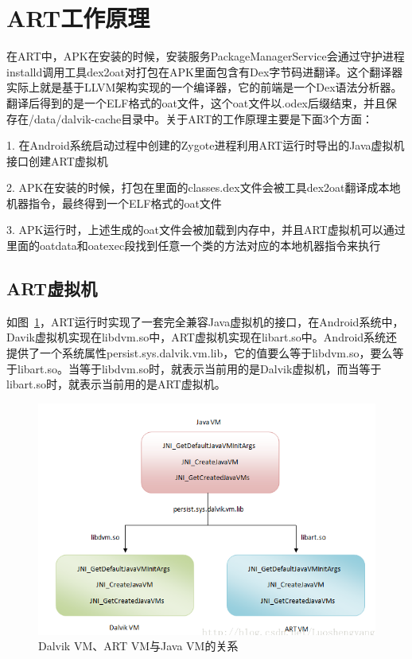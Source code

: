 \section{ART工作原理}
在ART中，APK在安装的时候，安装服务PackageManagerService会通过守护进程installd调用工具dex2oat对打包在APK里面包含有Dex字节码进翻译。这个翻译器实际上就是基于LLVM架构实现的一个编译器，它的前端是一个Dex语法分析器。翻译后得到的是一个ELF格式的oat文件，这个oat文件以.odex后缀结束，并且保存在/data/dalvik-cache目录中。关于ART的工作原理主要是下面3个方面：

1. 在Android系统启动过程中创建的Zygote进程利用ART运行时导出的Java虚拟机接口创建ART虚拟机

2. APK在安装的时候，打包在里面的classes.dex文件会被工具dex2oat翻译成本地机器指令，最终得到一个ELF格式的oat文件

3. APK运行时，上述生成的oat文件会被加载到内存中，并且ART虚拟机可以通过里面的oatdata和oatexec段找到任意一个类的方法对应的本地机器指令来执行

\subsection{ART虚拟机}
如图~\ref{fig:artvm}，ART运行时实现了一套完全兼容Java虚拟机的接口，在Android系统中，Davik虚拟机实现在libdvm.so中，ART虚拟机实现在libart.so中。Android系统还提供了一个系统属性persist.sys.dalvik.vm.lib，它的值要么等于libdvm.so，要么等于libart.so。当等于libdvm.so时，就表示当前用的是Dalvik虚拟机，而当等于libart.so时，就表示当前用的是ART虚拟机。
\begin{figure}[hbpt]
\centering
\includegraphics[width=\textwidth]{img/artvm.png}
\caption{Dalvik VM、ART VM与Java VM的关系}
\label{fig:artvm}
\end{figure}

